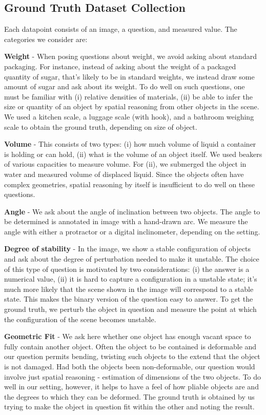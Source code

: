 \subsection{Ground Truth Dataset Collection}
Each datapoint consists of an image, a question, and measured value. The categories we consider are:

\textbf{Weight} - When posing questions about weight, we avoid asking about standard packaging. For instance, instead of asking
about the weight of a packaged quantity of sugar, that's likely to be in standard weights, we instead draw some amount of sugar
and ask about its weight. To do well on such questions, one must be familiar with (i) relative densities of materials, (ii) be able to infer the size or quantity of an object by spatial reasoning from other objects in the scene. We used a kitchen scale, 
a luggage scale (with hook), and a bathroom weighing scale to obtain the ground truth, depending on size of object.

\textbf{Volume} - This consists of two types: (i) how much volume of liquid a container is holding or can hold, 
(ii) what is the volume of an object itself. We used beakers of various capacities to measure volume. For (ii), we submerged the object in water and measured volume of displaced liquid. Since the objects often have complex geometries, spatial reasoning by itself is insufficient to do well on these questions.

\textbf{Angle} - We ask about the angle of inclination between two objects. The angle to be determined is annotated in image with a hand-drawn arc. We measure the angle with either a protractor or a digital inclinometer, depending on the setting.

\textbf{Degree of stability} - In the image, we show a stable configuration of objects and ask about the degree of perturbation needed to make it unstable. The choice of this type of question is motivated by two considerations: (i) the answer is a numerical value, (ii) it is hard to capture a configuration in a unstable state; it's much more likely that the scene shown in the image will correspond to a stable state. This makes the binary version of the question easy to answer. To get the ground truth, we perturb the object in question and measure the point at which the configuration of the scene becomes unstable.

\textbf{Geometric Fit} - We ask here whether one object has enough vacant space to fully contain another object. Often the object to be contained is deformable and our question permits bending, twisting such objects to the extend that the object is not damaged. Had both the objects been non-deformable, our question would involve just spatial reasoning - estimation of dimensions of the two objects. To do well in our setting, however, it helps to have a feel of how pliable objects are and the degrees to which they can be deformed. The ground truth is obtained by us trying to make the object in question fit within the other and noting the result.

